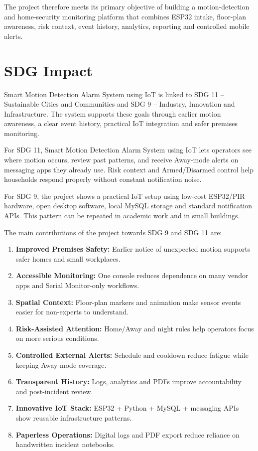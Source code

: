 \documentclass[12pt,a4paper]{report}
\begin{document}
The project therefore meets its primary objective of building a motion-detection and home-security monitoring platform that combines ESP32 intake, floor-plan awareness, risk context, event history, analytics, reporting and controlled mobile alerts.

\section{SDG Impact}

Smart Motion Detection Alarm System using IoT is linked to SDG 11 -- Sustainable Cities and Communities and SDG 9 -- Industry, Innovation and Infrastructure. The system supports these goals through earlier motion awareness, a clear event history, practical IoT integration and safer premises monitoring.

For SDG 11, Smart Motion Detection Alarm System using IoT lets operators see where motion occurs, review past patterns, and receive Away-mode alerts on messaging apps they already use. Risk context and Armed/Disarmed control help households respond properly without constant notification noise.

For SDG 9, the project shows a practical IoT setup using low-cost ESP32/PIR hardware, open desktop software, local MySQL storage and standard notification APIs. This pattern can be repeated in academic work and in small buildings.

The main contributions of the project towards SDG 9 and SDG 11 are:

\begin{enumerate}

    \item \textbf{Improved Premises Safety:} Earlier notice of unexpected motion supports safer homes and small workplaces.

    \item \textbf{Accessible Monitoring:} One console reduces dependence on many vendor apps and Serial Monitor-only workflows.

    \item \textbf{Spatial Context:} Floor-plan markers and animation make sensor events easier for non-experts to understand.

    \item \textbf{Risk-Assisted Attention:} Home/Away and night rules help operators focus on more serious conditions.

    \item \textbf{Controlled External Alerts:} Schedule and cooldown reduce fatigue while keeping Away-mode coverage.

    \item \textbf{Transparent History:} Logs, analytics and PDFs improve accountability and post-incident review.

    \item \textbf{Innovative IoT Stack:} ESP32 + Python + MySQL + messaging APIs show reusable infrastructure patterns.

    \item \textbf{Paperless Operations:} Digital logs and PDF export reduce reliance on handwritten incident notebooks.

\end{enumerate}
\end{document}
